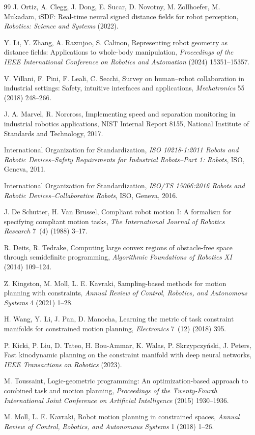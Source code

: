 \documentclass[preprint,12pt]{elsarticle}
\begin{document}
\begin{thebibliography}{99}
J. Ortiz, A. Clegg, J. Dong, E. Sucar, D. Novotny, M. Zollhoefer, M. Mukadam,
iSDF: Real-time neural signed distance fields for robot perception,
\textit{Robotics: Science and Systems} (2022).

Y. Li, Y. Zhang, A. Razmjoo, S. Calinon,
Representing robot geometry as distance fields: Applications to whole-body manipulation,
\textit{Proceedings of the IEEE International Conference on Robotics and Automation} (2024) 15351--15357.

V. Villani, F. Pini, F. Leali, C. Secchi,
Survey on human--robot collaboration in industrial settings: Safety, intuitive interfaces and applications,
\textit{Mechatronics} 55 (2018) 248--266.

J. A. Marvel, R. Norcross,
Implementing speed and separation monitoring in industrial robotics applications,
NIST Internal Report 8155, National Institute of Standards and Technology, 2017.

International Organization for Standardization,
\textit{ISO 10218-1:2011 Robots and Robotic Devices--Safety Requirements for Industrial Robots--Part 1: Robots},
ISO, Geneva, 2011.

International Organization for Standardization,
\textit{ISO/TS 15066:2016 Robots and Robotic Devices--Collaborative Robots},
ISO, Geneva, 2016.

J. De Schutter, H. Van Brussel,
Compliant robot motion I: A formalism for specifying compliant motion tasks,
\textit{The International Journal of Robotics Research} 7~(4) (1988) 3--17.

R. Deits, R. Tedrake,
Computing large convex regions of obstacle-free space through semidefinite programming,
\textit{Algorithmic Foundations of Robotics XI} (2014) 109--124.

Z. Kingston, M. Moll, L. E. Kavraki,
Sampling-based methods for motion planning with constraints,
\textit{Annual Review of Control, Robotics, and Autonomous Systems} 4 (2021) 1--28.

H. Wang, Y. Li, J. Pan, D. Manocha,
Learning the metric of task constraint manifolds for constrained motion planning,
\textit{Electronics} 7~(12) (2018) 395.

P. Kicki, P. Liu, D. Tateo, H. Bou-Ammar, K. Walas, P. Skrzypczy\'nski, J. Peters,
Fast kinodynamic planning on the constraint manifold with deep neural networks,
\textit{IEEE Transactions on Robotics} (2023).

M. Toussaint,
Logic-geometric programming: An optimization-based approach to combined task and motion planning,
\textit{Proceedings of the Twenty-Fourth International Joint Conference on Artificial Intelligence} (2015) 1930--1936.

M. Moll, L. E. Kavraki,
Robot motion planning in constrained spaces,
\textit{Annual Review of Control, Robotics, and Autonomous Systems} 1 (2018) 1--26.

\end{thebibliography}
\end{document}
